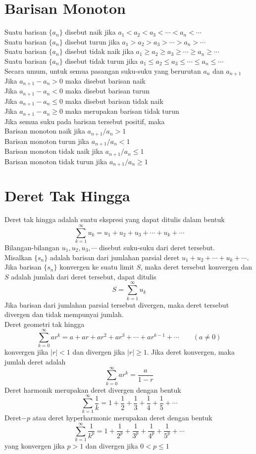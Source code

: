 \documentclass{article}
\begin{document}
\section{Barisan Monoton}
Suatu barisan $\{a_n\}$ disebut naik jika $a_1<a_2<a_3<\cdots <a_n<\cdots$\\
Suatu barisan $\{a_n\}$ disebut turun jika $a_1>a_2>a_3>\cdots >a_n>\cdots$\\
Suatu barisan $\{a_n\}$ disebut tidak naik jika $a_1\geq a_2\geq a_3\geq \cdots \geq a_n\geq \cdots$\\
Suatu barisan $\{a_n\}$ disebut tidak turun jika $a_1\leq a_2\leq a_3\leq \cdots \leq a_n\leq \cdots$\\
Secara umum, untuk semua pasangan suku-suku yang berurutan $a_n$ dan $a_{n+1}$\\
Jika $a_{n+1}-a_n>0$ maka disebut barisan naik\\
Jika $a_{n+1}-a_n<0$ maka disebut barisan turun\\
Jika $a_{n+1}-a_n\leq 0$ maka disebut barisan tidak naik \\
Jika $a_{n+1}-a_n\geq 0$ maka merupakan barisan tidak turun\\
Jika semua suku pada barisan tersebut positif, maka \\
Barisan monoton naik jika $a_{n+1}/a_n>1$\\
Barisan monoton turun jika $a_{n+1}/a_n<1$\\
Barisan monoton tidak naik jika $a_{n+1}/a_n\leq 1$\\
Barisan monoton tidak turun jika $a_{n+1}/a_n\geq 1$
\section{Deret Tak Hingga}
Deret tak hingga adalah suatu ekspresi yang dapat ditulis dalam bentuk 
$$ \sum_{k=1}^\infty u_k = u_1+u_2+u_3+\cdots+u_k+\cdots $$
Bilangan-bilangan $u_1,u_2,u_3,\cdots$ disebut suku-suku dari deret tersebut.\\
Misalkan $\{s_n\}$ adalah barisan dari jumlahan parsial deret $u_1+u_2+\cdots+u_k+\cdots$. Jika barisan $\{s_n\}$ konvergen ke suatu limit $S$, maka deret tersebut konvergen dan $S$ adalah jumlah dari deret tersebut, dapat ditulis 
$$ S=\sum_{k=1}^\infty u_k $$
Jika barisan dari jumlahan parsial tersebut divergen, maka deret tersebut divergen dan tidak mempunyai jumlah.\\
Deret geometri tak hingga 
$$ \sum_{k=0}^\infty ar^k = a+ar+ar^2+ar^3+\cdots + ar^{k-1}+\cdots \qquad (a\neq 0) $$
konvergen jika $|r|<1$ dan divergen jika $|r|\geq 1$. Jika deret konvergen, maka jumlah deret adalah 
$$ \sum_{k=0}^\infty ar^k =  \dfrac{a}{1-r} $$
Deret harmonik merupakan deret divergen dengan bentuk 
$$ \sum_{k=1}^\infty \dfrac{1}{k} = 1+\dfrac{1}{2}+\dfrac{1}{3}+\dfrac{1}{4}+\dfrac{1}{5}+\cdots  $$
Deret$-p$ atau deret hyperharmonic merupakan deret dengan bentuk 
$$ \sum_{k=1}^\infty \dfrac{1}{k^p} = 1+\dfrac{1}{2^p}+\dfrac{1}{3^p}+\dfrac{1}{4^p}+\dfrac{1}{5^p}+\cdots  $$
yang konvergen jika $p>1$ dan divergen jika $0<p\leq 1$
\end{document}
